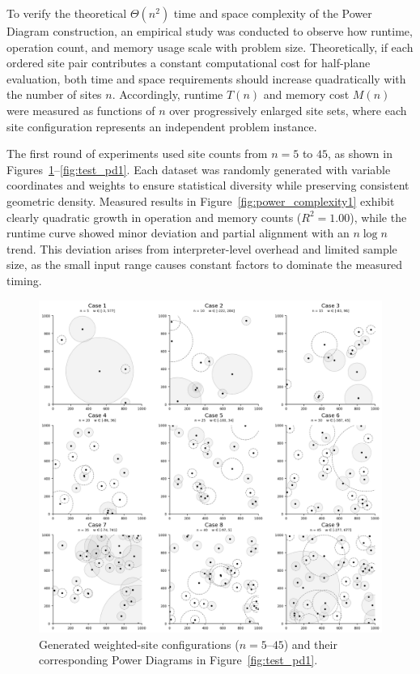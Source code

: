 \documentclass{article}
\begin{document}

To verify the theoretical $\Theta(n^2)$ time and space complexity of the Power Diagram construction, an empirical study was conducted to observe how runtime, operation count, and memory usage scale with problem size.  
Theoretically, if each ordered site pair contributes a constant computational cost for half-plane evaluation, both time and space requirements should increase quadratically with the number of sites $n$.  
Accordingly, runtime $T(n)$ and memory cost $M(n)$ were measured as functions of $n$ over progressively enlarged site sets, where each site configuration represents an independent problem instance.

The first round of experiments used site counts from $n=5$ to $45$, as shown in Figures~\ref{fig:test_sites1}–\ref{fig:test_pd1}.  
Each dataset was randomly generated with variable coordinates and weights to ensure statistical diversity while preserving consistent geometric density.  
Measured results in Figure~\ref{fig:power_complexity1} exhibit clearly quadratic growth in operation and memory counts ($R^2\!=\!1.00$), while the runtime curve showed minor deviation and partial alignment with an $n\log n$ trend.  
This deviation arises from interpreter-level overhead and limited sample size, as the small input range causes constant factors to dominate the measured timing.

\begin{figure}[H]
    \centering
    \includegraphics[width=0.95\linewidth]{Pictures/test_sites1.png}
    \caption{Generated weighted-site configurations ($n=5$–$45$) and their corresponding Power Diagrams in Figure~\ref{fig:test_pd1}.}
    \label{fig:test_sites1}
\end{figure}
\end{document}
